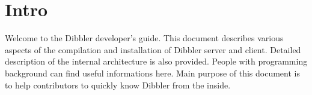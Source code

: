 
\section{Intro}
Welcome to the Dibbler developer's guide. This document describes
various aspects of the compilation and installation of Dibbler server
and client. Detailed description of the internal architecture is also
provided. People with programming background can find useful
informations here. Main purpose of this document is to help
contributors to quickly know Dibbler from the inside.